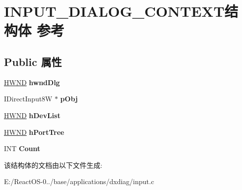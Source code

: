 \hypertarget{struct_i_n_p_u_t___d_i_a_l_o_g___c_o_n_t_e_x_t}{}\section{I\+N\+P\+U\+T\+\_\+\+D\+I\+A\+L\+O\+G\+\_\+\+C\+O\+N\+T\+E\+X\+T结构体 参考}
\label{struct_i_n_p_u_t___d_i_a_l_o_g___c_o_n_t_e_x_t}
\subsection*{Public 属性}
\begin{DoxyCompactItemize}
\item 
\mbox{\label{struct_i_n_p_u_t___d_i_a_l_o_g___c_o_n_t_e_x_t_a87a840a9b04c1c4bb4e810553354d063}} 
\hyperlink{interfacevoid}{H\+W\+ND} {\bfseries hwnd\+Dlg}
\item 
\mbox{\label{struct_i_n_p_u_t___d_i_a_l_o_g___c_o_n_t_e_x_t_a228968c41204cda50593be3df1f5adf1}} 
I\+Direct\+Input8W $\ast$ {\bfseries p\+Obj}
\item 
\mbox{\label{struct_i_n_p_u_t___d_i_a_l_o_g___c_o_n_t_e_x_t_a5adfc356d1778647ff8bf0b82cc1e9c0}} 
\hyperlink{interfacevoid}{H\+W\+ND} {\bfseries h\+Dev\+List}
\item 
\mbox{\label{struct_i_n_p_u_t___d_i_a_l_o_g___c_o_n_t_e_x_t_ad8d65a5f0a37de8818c04f33cf62af4f}} 
\hyperlink{interfacevoid}{H\+W\+ND} {\bfseries h\+Port\+Tree}
\item 
\mbox{\label{struct_i_n_p_u_t___d_i_a_l_o_g___c_o_n_t_e_x_t_af31a0ae20e2c6350d74084cb8c7c7773}} 
I\+NT {\bfseries Count}
\end{DoxyCompactItemize}


该结构体的文档由以下文件生成\+:\begin{DoxyCompactItemize}
\item 
E\+:/\+React\+O\+S-\/0../base/applications/dxdiag/input.\+c\end{DoxyCompactItemize}
